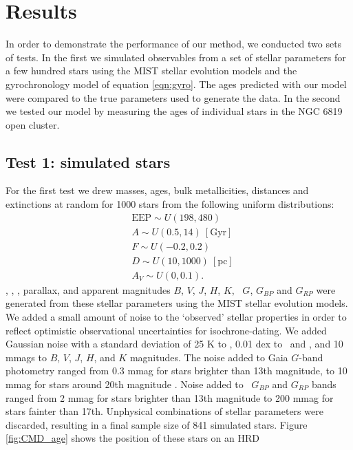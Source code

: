 \section{Results}
\label{section:results}

In order to demonstrate the performance of our method, we conducted two sets
of tests.
In the first we simulated observables from a set of stellar parameters for a
few hundred stars using the MIST stellar evolution models and the
gyrochronology model of equation \ref{eqn:gyro}.
The ages predicted with our model were compared to the true parameters used to
generate the data.
In the second we tested our model by measuring the ages of individual stars in
the NGC 6819 open cluster.

\subsection{Test 1: simulated stars}
For the first test we drew masses, ages, bulk metallicities, distances and
extinctions at random for 1000 stars from the following uniform distributions:
\begin{eqnarray}
& \mathrm{EEP} \sim U(198, 480) \\
& A \sim U(0.5, 14)\mathrm{~[Gyr]} \\
& F \sim U(-0.2, 0.2) \\
& D \sim U(10, 1000)~\mathrm{[pc]} \\
& A_V \sim U(0, 0.1).
\end{eqnarray}
\teff, \logg, \fhat, parallax, and apparent magnitudes $B$, $V$, $J$, $H$, $K$,
\gaia\ $G$, $G_{BP}$ and $G_{RP}$ were generated from these
stellar parameters using the MIST stellar evolution models.
We added a small amount of noise to the `observed' stellar properties in order
to reflect optimistic observational uncertainties for isochrone-dating.
We added Gaussian noise with a standard deviation of 25 K to \teff, 0.01 dex
to \feh\ and \logg, and 10 mmags to $B$, $V$, $J$, $H$, and $K$ magnitudes.
The noise added to Gaia $G$-band photometry ranged from
0.3 mmag for stars brighter than 13th magnitude, to 10 mmag for stars
around 20th magnitude \citep{evans2017, brown2018}.
Noise added to \gaia\ $G_{BP}$ and $G_{RP}$ bands ranged from 2 mmag for stars
brighter than 13th magnitude to 200 mmag for stars fainter than 17th.
Unphysical combinations of stellar parameters were discarded, resulting in a
final sample size of 841 simulated stars.
Figure \ref{fig:CMD_age} shows the position of these stars on an HRD
